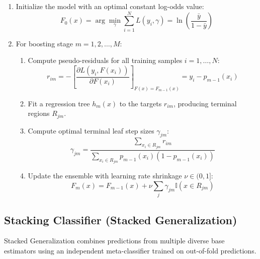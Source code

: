 \documentclass[12pt,a4paper]{article}
\begin{document}
\begin{enumerate}
\item Initialize the model with an optimal constant log-odds value:
\begin{equation}
F_0(x) = \arg\min_{\gamma} \sum_{i=1}^{N} L(y_i, \gamma) = \ln \left( \frac{\bar{y}}{1 - \bar{y}} \right)
\end{equation}
\item For boosting stage $m = 1, 2, \dots, M$:
\begin{enumerate}
\item Compute pseudo-residuals for all training samples $i = 1, \dots, N$:
\begin{equation}
r_{im} = - \left[ \frac{\partial L(y_i, F(x_i))}{\partial F(x_i)} \right]_{F(x) = F_{m-1}(x)} = y_i - p_{m-1}(x_i)
\end{equation}
\item Fit a regression tree $h_m(x)$ to the targets $r_{im}$, producing terminal regions $R_{jm}$.
\item Compute optimal terminal leaf step sizes $\gamma_{jm}$:
\begin{equation}
\gamma_{jm} = \frac{\sum_{x_i \in R_{jm}} r_{im}}{\sum_{x_i \in R_{jm}} p_{m-1}(x_i) (1 - p_{m-1}(x_i))}
\end{equation}
\item Update the ensemble with learning rate shrinkage $\nu \in (0, 1]$:
\begin{equation}
F_m(x) = F_{m-1}(x) + \nu \sum_{j} \gamma_{jm} \mathbb{I}(x \in R_{jm})
\end{equation}
\end{enumerate}
\end{enumerate}

\subsection{Stacking Classifier (Stacked Generalization)}

Stacked Generalization combines predictions from multiple diverse base estimators using an independent meta-classifier trained on out-of-fold predictions.
\end{document}
